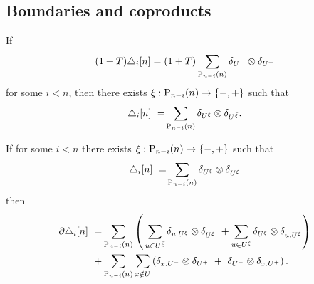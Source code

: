\subsection{Boundaries and coproducts}



\begin{lemma} \label{lemma: (1+T) triangle = (1+T) sum implies triangle = sum}
    If
    \[
    (1 + T) \triangle_i  [n] =
    (1 + T) \sum_{\P_{n-i}(n)} \delta_{U^-} \ot \delta_{U^+}
    \]
    for some $i < n$, then there exists $\xi : \P_{n-i}(n) \to \{-, +\}$  such that
    \[
    \triangle_i  [n]\ =\! \sum_{\P_{n-i}(n)} \delta_{U^{\xi}} \ot \delta_{U^{\bar{\xi}}}.
    \]
\end{lemma}


\begin{lemma} \label{lemma: boundary of triangle}
	If for some $i < n$ there exists $\xi : \P_{n-i}(n) \to \{-, +\}$ such that
	\[
	\triangle_i [n]\ =\! \sum_{\P_{n-i}(n)} \delta_{U^{\xi}} \ot \delta_{U^{{\bar{\xi}}}}
	\]
	then
	\begin{align}
	\label{equation: boundary of triangle}
	\partial \triangle_i [n]\ = &
	\sum_{\P_{n-i}(n)} \left( \, \sum_{u \in U^{\bar{\xi}}} \delta_{u.U^\xi} \tensor \delta_{U^{\bar{\xi}}} \ +
	\sum_{u \in U^\xi} \delta_{U^\xi} \tensor \delta_{u.U^{\bar{\xi}}} \right) \\ + &
	\sum_{\P_{n-i}(n)} \sum_{x \notin U} \left( \delta_{x.U^-} \tensor \delta_{U^+}\ +\ \delta_{U^-} \tensor \delta_{x.U^+} \right).
	\end{align}
\end{lemma}

